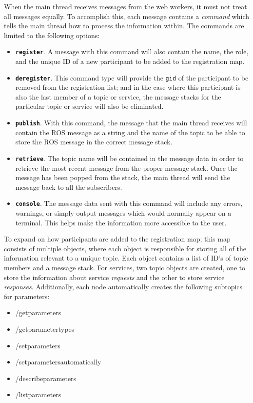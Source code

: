     When the main thread receives messages from the web workers, it must not treat all messages equally. To accomplish this, each message contains a \textit{command} which tells the main thread how to process the information within. The commands are limited to the following options:

    \begin{itemize}
        \item \textbf{\texttt{register}}. A message with this command will also contain the name, the role, and the unique ID of a new participant to be added to the registration map.  
        \item \textbf{\texttt{deregister}}. This command type will provide the \texttt{gid} of the participant to be removed from the registration list; and in the case where this participant is also the last member of a topic or service, the message stacks for the particular topic or service will also be eliminated.
        \item \textbf{\texttt{publish}}. With this command, the message that the main thread receives will contain the \ac{ROS} message as a string and the name of the topic to be able to store the \ac{ROS} message in the correct message stack.
        \item \textbf{\texttt{retrieve}}. The topic name will be contained in the message data in order to retrieve the most recent message from the proper message stack. Once the message has been popped from the stack, the main thread will send the message back to all the subscribers.
        \item \textbf{\texttt{console}}. The message data sent with this command will include any errors, warnings, or simply output messages which would normally appear on a terminal. This helps make the information more accessible to the user.
    \end{itemize}

    To expand on how participants are added to the registration map; this map consists of multiple objects, where each object is responsible for storing all of the information relevant to a unique topic. Each object contains a list of ID's of topic members and a message stack. For services, two topic objects are created, one to store the information about service \textit{requests} and the other to store service \textit{responses}. Additionally, each node automatically creates the following subtopics for parameters:

    \begin{itemize}
        \item \textsf{/get\smallunderscore parameters}
        \item \textsf{/get\smallunderscore parameter\smallunderscore types}
        \item \textsf{/set\smallunderscore parameters}
        \item \textsf{/set\smallunderscore parameters\smallunderscore automatically}
        \item \textsf{/describe\smallunderscore parameters}
        \item \textsf{/list\smallunderscore parameters}
    \end{itemize}


